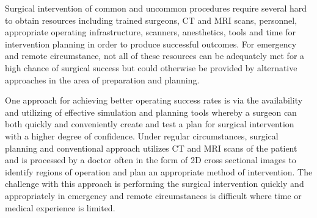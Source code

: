 






Surgical intervention of common and uncommon procedures require several hard to obtain resources including trained surgeons, CT and MRI scans, personnel, appropriate operating infrastructure, scanners, anesthetics, tools and time for intervention planning in order to produce successful outcomes. For emergency and remote circumstance, not all of these resources can be adequately met for a high chance of surgical success but could otherwise be provided by alternative approaches in the area of preparation and planning.

One approach for achieving better operating success rates is via the availability and utilizing of effective simulation and planning tools whereby a surgeon can both quickly and conveniently create and test a plan for surgical intervention with a higher degree of confidence. Under regular circumstances, surgical planning and conventional approach utilizes CT and MRI scans of the patient and is processed by a doctor often in the form of 2D cross sectional images to identify regions of operation and plan an appropriate method of intervention. The challenge with this approach is performing the surgical intervention quickly and appropriately in emergency and remote circumstances is difficult where time or medical experience is limited.

